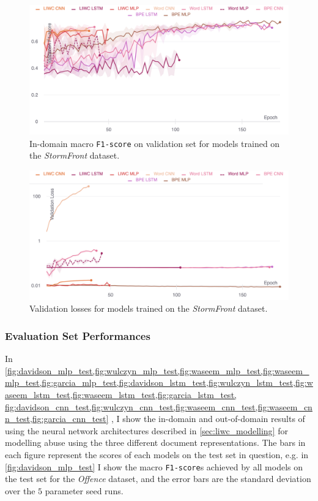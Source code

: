 \begin{figure}
    \centering
    \includegraphics[width=\textwidth]{garcia_dev_f1.pdf}
    \caption{In-domain macro \texttt{F1-score} on validation set for models trained on the \textit{StormFront} dataset.}
    \label{fig:garcia_dev_f1}
\end{figure}
\begin{figure}
    \centering
    \includegraphics[width=\textwidth]{garcia_dev_loss_stderr_logscale.pdf}
    \caption{Validation losses for models trained on the \textit{StormFront} dataset.}
    \label{fig:garcia_dev_loss}
\end{figure}

\subsubsection{Evaluation Set Performances}
In \cref{fig:davidson_mlp_test,fig:wulczyn_mlp_test,fig:waseem_mlp_test,fig:waseem_mlp_test,fig:garcia_mlp_test,fig:davidson_lstm_test,fig:wulczyn_lstm_test,fig:waseem_lstm_test,fig:waseem_lstm_test,fig:garcia_lstm_test, fig:davidson_cnn_test,fig:wulczyn_cnn_test,fig:waseem_cnn_test,fig:waseem_cnn_test,fig:garcia_cnn_test}
, I show the in-domain and out-of-domain results of using the neural network architectures described in \cref{sec:liwc_modelling} for modelling abuse using the three different document representations. 
The bars in each figure represent the scores of each models on the test set in question, e.g. in \cref{fig:davidson_mlp_test} I show the macro \texttt{F1-score}s achieved by all models on the test set for the \textit{Offence} dataset, and the error bars are the standard deviation over the $5$ parameter seed runs.

